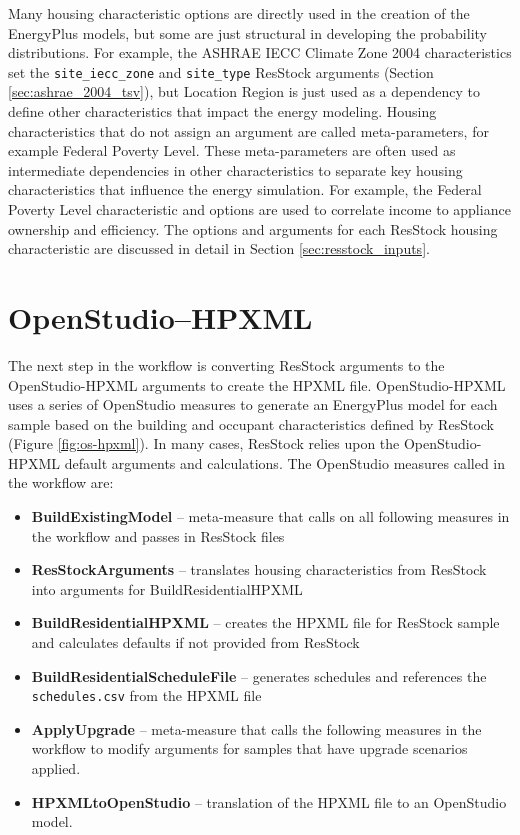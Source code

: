Many housing characteristic options are directly used in the creation of the EnergyPlus models, but some are just structural in developing the probability distributions. For example, the ASHRAE IECC Climate Zone 2004 characteristics set the \texttt{site\_iecc\_zone} and \texttt{site\_type} ResStock arguments (Section \ref{sec:ashrae_2004_tsv}), but Location Region is just used as a dependency to define other characteristics that impact the energy modeling. Housing characteristics that do not assign an argument are called meta-parameters, for example Federal Poverty Level. These meta-parameters are often used as intermediate dependencies in other characteristics to separate key housing characteristics that influence the energy simulation. For example, the Federal Poverty Level characteristic and options are used to correlate income to appliance ownership and efficiency. The options and arguments for each ResStock housing characteristic are discussed in detail in Section \ref{sec:resstock_inputs}. 

\section{OpenStudio--HPXML}

The next step in the workflow is converting ResStock arguments to the OpenStudio-HPXML arguments to create the HPXML file. OpenStudio-HPXML uses a series of OpenStudio measures to generate an EnergyPlus model for each sample based on the building and occupant characteristics defined by ResStock (Figure \ref{fig:os-hpxml}). In many cases, ResStock relies upon the OpenStudio-HPXML default arguments and calculations. The OpenStudio measures called in the workflow are:

\begin{itemize}
    \item \textbf{BuildExistingModel} -- meta-measure that calls on all following measures in the workflow and passes in ResStock files
    \item \textbf{ResStockArguments} -- translates housing characteristics from ResStock into arguments for BuildResidentialHPXML
    \item \textbf{BuildResidentialHPXML} -- creates the HPXML file for ResStock sample and calculates defaults if not provided from ResStock
    \item \textbf{BuildResidentialScheduleFile} -- generates schedules and references the \texttt{schedules.csv} from the HPXML file
    \item \textbf{ApplyUpgrade} -- meta-measure that calls the following measures in the workflow to modify arguments for samples that have upgrade scenarios applied. 
    \item \textbf{HPXMLtoOpenStudio} -- translation of the HPXML file to an OpenStudio model.
\end{itemize}

